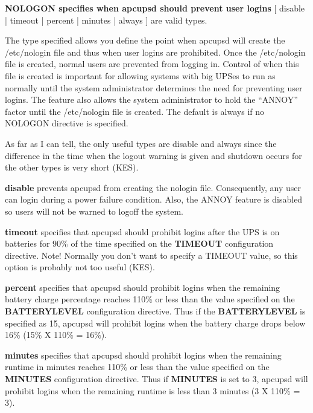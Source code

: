 {{{{{{{{{{{\begin{description}
\item {\bf NOLOGON \lt{}specifies when apcupsd should prevent user
logins\gt{}}
[ disable | timeout | percent | minutes | always ] are valid types.  

The type specified allows you define the point when apcupsd will create the
/etc/nologin file and thus when user logins are prohibited. Once the
/etc/nologin file is created, normal users are prevented from logging in.
Control of when this file is created is important for allowing systems with
big UPSes to run as normally until the system administrator determines the
need for preventing user logins. The feature also allows the system
administrator to hold the ``ANNOY'' factor until the /etc/nologin file is
created. The default is always if no NOLOGON directive is specified.  

As far as I can tell, the only useful types are disable and always since the
difference in the time when the logout warning is given and shutdown occurs
for the other types is very short (KES).  

\begin{description}

\item {\bf disable}
prevents apcupsd from creating the nologin file.  Consequently, any user can
login during a power failure condition.  Also, the ANNOY feature is disabled
so users will not be warned to logoff the system.  

\item {\bf timeout}
specifies that apcupsd should prohibit logins after the UPS is on batteries
for 90\% of the time specified on the {\bf TIMEOUT} configuration directive.
Note! Normally you don't want to specify a TIMEOUT value, so this option is
probably not too useful (KES).  

\item {\bf percent}
specifies that apcupsd should prohibit logins when the remaining battery
charge percentage reaches 110\% or less than the value specified on the {\bf
BATTERYLEVEL} configuration directive. Thus if the {\bf BATTERYLEVEL} is
specified as 15, apcupsd will prohibit logins when the battery charge drops
below 16\% (15\% X 110\% = 16\%).  

\item {\bf minutes}
specifies that apcupsd should prohibit logins when the remaining runtime in
minutes reaches 110\% or less than the value specified on the {\bf MINUTES}
configuration directive.  Thus if {\bf MINUTES} is set to 3, apcupsd will
prohibit logins when the remaining runtime is less than 3 minutes (3 X 110\% =
3).  


\end{description}
\end{description}}}}}}}}}}}}

